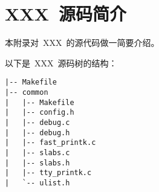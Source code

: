 \section{XXX~源码简介}

本附录对~XXX~的源代码做一简要介绍。

以下是~XXX~源码树的结构：

\begin{sourcelist}\begin{verbatim}
|-- Makefile
|-- common
|   |-- Makefile
|   |-- config.h
|   |-- debug.c
|   |-- debug.h
|   |-- fast_printk.c
|   |-- slabs.c
|   |-- slabs.h
|   |-- tty_printk.c
|   `-- ulist.h
\end{verbatim}\end{sourcelist}


